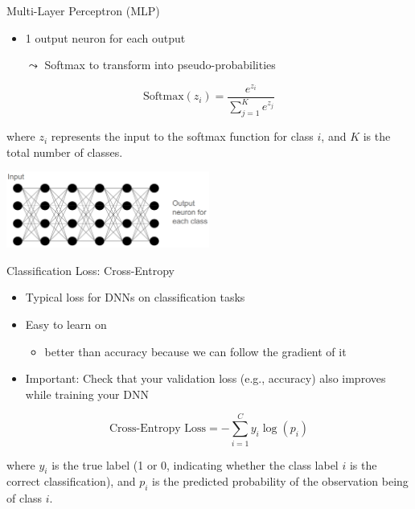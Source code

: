 \documentclass[aspectratio=169]{../latex_main/tntbeamer}  %
\begin{document}
  	\begin{frame}{Multi-Layer Perceptron (MLP)}

        \begin{itemize}
            \item 1 output neuron for each output
            \item[$\leadsto$] Softmax to transform into pseudo-probabilities
        \end{itemize}

        \[
        \text{Softmax}(z_i) = \frac{e^{z_i}}{\sum_{j=1}^{K} e^{z_j}}
        \]
        
        where \( z_i \) represents the input to the softmax function for class \( i \), and \( K \) is the total number of classes.

        \centering
        \includegraphics[width=0.5\textwidth]{figures/mlp2.png}
                
	\end{frame}

  	\begin{frame}{Classification Loss: Cross-Entropy}

        \begin{itemize}
            \item Typical loss for DNNs on classification tasks
            \item Easy to learn on 
            \begin{itemize}
                \item better than accuracy because we can follow the gradient of it 
            \end{itemize}
            \item Important: Check that your validation loss (e.g., accuracy) also improves while training your DNN
        \end{itemize}

        \[
        \text{Cross-Entropy Loss} = -\sum_{i=1}^{C} y_i \log(p_i)
        \]
        
        where \( y_i \) is the true label (1 or 0, indicating whether the class label \( i \) is the correct classification), and \( p_i \) is the predicted probability of the observation being of class \( i \).
                
	\end{frame}

 	
\end{document}

